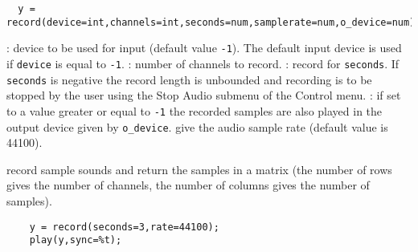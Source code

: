 \begin{mandesc}
\end{mandesc}
\begin{calling_sequence}
\begin{verbatim}
  y = record(device=int,channels=int,seconds=num,samplerate=num,o_device=num)
\end{verbatim}
\end{calling_sequence}
\begin{parameters}
  \begin{varlist}
   : device to be used for input (default value \verb+-1+). The default
   input device is used if \verb+device+ is equal to \verb+-1+.
   : number of channels to record.
   : record for \verb+seconds+. If \verb+seconds+ is negative the 
   record length is unbounded and recording is to be stopped by the user using the 
   Stop Audio submenu of the Control menu. 
   : if set to a value greater or equal to \verb+-1+ the recorded 
   samples are also played in the output device given by \verb+o_device+.
    give the audio sample rate (default value is 44100).
  \end{varlist}
\end{parameters}

\begin{mandescription}
  record sample sounds and return the samples in a matrix (the number of 
  rows gives the number of channels, the number of columns gives the number of samples).
\end{mandescription}
\begin{examples}
  \begin{Verbatim}
    y = record(seconds=3,rate=44100);
    play(y,sync=%t);
  \end{Verbatim}
\end{examples}
\begin{manseealso}
\end{manseealso}

